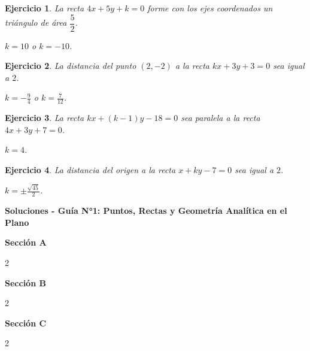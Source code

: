 \documentclass[12pt,a4paper]{article}
\newtheorem{ex}{Ejercicio}
\begin{document}
\begin{itemize}
\begin{ex}
La recta $4x + 5y + k = 0$ forme con los ejes coordenados un triángulo de área $\dfrac{5}{2}$. 
\begin{sol} $k = 10$ o $k = -10$. \end{sol}
\end{ex}

\begin{ex}
La distancia del punto $(2,-2)$ a la recta $kx + 3y + 3 = 0$ sea igual a $2$. 
\begin{sol} $k = -\frac{9}{4}$ o $k = \frac{7}{12}$. \end{sol}
\end{ex}

\begin{ex}
La recta $kx + (k-1)y - 18 = 0$ sea paralela a la recta $4x + 3y + 7 = 0$. 
\begin{sol} $k = 4$. \end{sol}
\end{ex}

\begin{ex}
La distancia del origen a la recta $x + ky - 7 = 0$ sea igual a $2$. 
\begin{sol} $k = \pm\frac{\sqrt{45}}{2}$. \end{sol}
\end{ex}


\end{itemize}

\newpage
\small
\begin{center}
    {\bfseries\Large Soluciones - Guía N°1: Puntos, Rectas y Geometría Analítica en el Plano}\\[10pt]
\end{center}

\textbf{Sección A}
\begin{multicols}{2}

\end{multicols}

\vspace{0.4cm}
\textbf{Sección B}
\begin{multicols}{2}

\end{multicols}

\vspace{0.4cm}
\textbf{Sección C}
\begin{multicols}{2}

\end{multicols}
\end{document}
